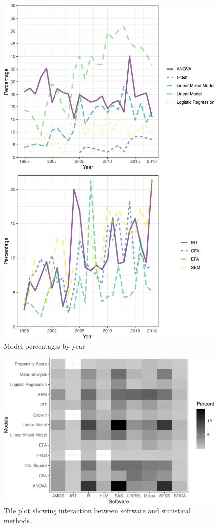 \documentclass[english,,man]{apa6}
\theoremstyle{definition}
\theoremstyle{definition}
\theoremstyle{definition}
\theoremstyle{remark}
\begin{document}
\begin{figure}
\centering
\includegraphics{software_files/figure-latex/model-year-at1-1.pdf}
\caption{\label{fig:model-year-at1}Model percentages by year}
\end{figure}

\begin{figure}
\centering
\includegraphics{software_files/figure-latex/software-statmethods-1.pdf}
\caption{\label{fig:software-statmethods}Tile plot showing interaction
between software and statistical methods.}
\end{figure}
\end{document}
